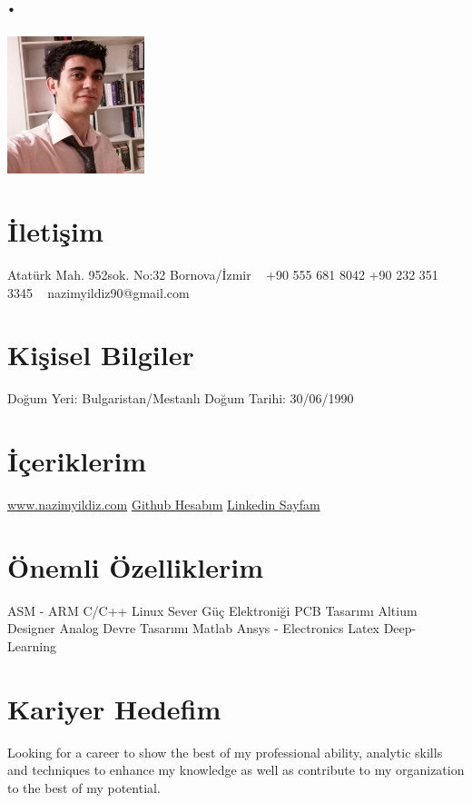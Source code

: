 \documentclass[]{cv-style} %
\begin{document}
\begin{aside}
\section{.}
\includegraphics[width=4cm]{photo.jpg}
\section{İletişim}
Atatürk Mah.
952sok. No:32
Bornova/İzmir
~
+90 555 681 8042
+90 232 351 3345
~
nazimyildiz90@gmail.com
\section{Kişisel Bilgiler}
Doğum Yeri: Bulgaristan/Mestanlı
\hspace{0.2mm}
Doğum Tarihi: 30/06/1990
\section{İçeriklerim}
\href{www.nazimyildiz.com}{www.nazimyildiz.com}
\href{https://github.com/namcho}{Github Hesabım}
\href{https://www.linkedin.com/in/naz%C4%B1m-y%C4%B1ld%C4%B1z-a67b0344/}{Linkedin Sayfam}
\section{Önemli Özelliklerim}
ASM - ARM
C/C++
Linux Sever
Güç Elektroniği
PCB Tasarımı
Altium Designer
Analog Devre Tasarımı
Matlab
Ansys - Electronics
Latex
Deep-Learning
\end{aside}
\section{Kariyer Hedefim}
  \vspace{-0.2cm}
Looking for a career to show the best of my professional ability, analytic skills and techniques to enhance my knowledge as well as contribute to my organization to the best of my potential.
\end{document}
